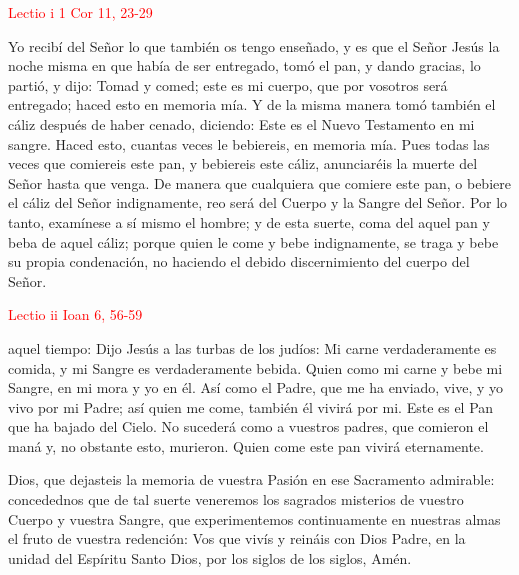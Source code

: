 \noindent\textcolor{red}{Lectio i \hfill 1 Cor 11, 23-29}

Yo recibí del Señor lo que también os tengo enseñado, y es que el Señor Jesús la noche misma en que había de ser entregado, tomó el pan, y dando gracias, lo partió, y dijo:
Tomad y comed; este es mi cuerpo, que por vosotros será entregado; haced esto en memoria mía. Y de la misma manera tomó también el cáliz después de haber cenado, diciendo: Este es el
Nuevo Testamento en mi sangre. Haced esto, cuantas veces le bebiereis, en memoria mía. Pues todas las veces que comiereis este pan, y bebiereis este cáliz, anunciaréis la muerte del
Señor hasta que venga. De manera que cualquiera que comiere este pan, o bebiere el cáliz del Señor indignamente, reo será del Cuerpo y la Sangre del Señor. Por lo tanto, examínese a
sí mismo el hombre; y de esta suerte, coma del aquel pan y beba de aquel cáliz; porque quien le come y bebe indignamente, se traga y bebe su propia condenación, no haciendo el debido
discernimiento del cuerpo del Señor.

\vspace{2mm}

\noindent\textcolor{red}{Lectio ii \hfill Ioan 6, 56-59}

aquel tiempo: Dijo Jesús a las turbas de los judíos: Mi carne verdaderamente es comida, y mi Sangre es verdaderamente bebida. Quien como mi carne y bebe mi Sangre, en mi mora y yo en él.
Así como el Padre, que me ha enviado, vive, y yo vivo por mi Padre; así quien me come, también él vivirá por mi. Este es el Pan que ha bajado del Cielo. No sucederá como a vuestros padres,
que comieron el maná y, no obstante esto, murieron. Quien come este pan vivirá eternamente.

\vspace{2mm}

\begin{otherlanguage}{latin}
      

      \vspace{1mm}

      

      \vspace{1mm}

      
\end{otherlanguage}

\vspace{2mm}

Dios, que dejasteis la memoria de vuestra Pasión en ese Sacramento admirable: concedednos que de tal suerte veneremos los sagrados misterios de vuestro Cuerpo 
y vuestra Sangre, que experimentemos continuamente en nuestras almas el fruto de vuestra redención: Vos que vivís y reináis con Dios Padre, en la unidad del Espíritu Santo Dios, 
por los siglos de los siglos, Amén.